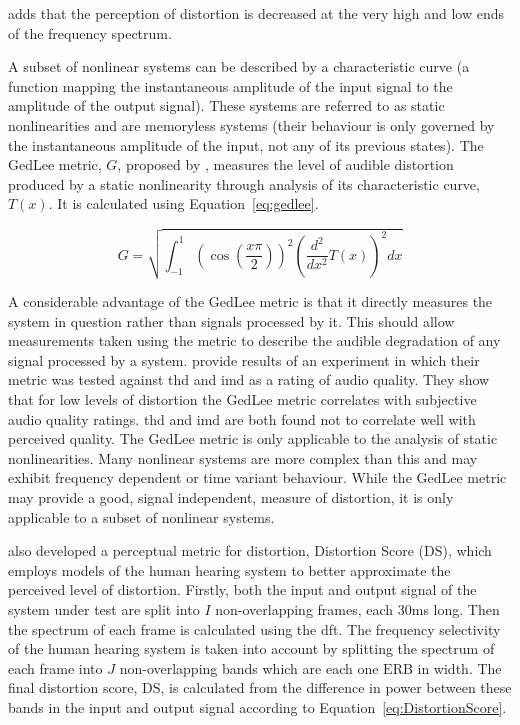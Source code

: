 			\citet{voishvillo2006assessment} adds that the perception of distortion is decreased at the very
			high and low ends of the frequency spectrum.

			A subset of nonlinear systems can be described by a characteristic curve (a function mapping the
			instantaneous amplitude of the input signal to the amplitude of the output signal). These systems
			are referred to as static nonlinearities and are memoryless systems (their behaviour is only
			governed by the instantaneous amplitude of the input, not any of its previous states). The GedLee
			metric, $G$, proposed by \citet{geddes2003auditory}, measures the level of audible distortion
			produced by a static nonlinearity through analysis of its characteristic curve, $T(x)$. It is
			calculated using Equation~\ref{eq:gedlee}.

			\begin{equation}
				G = \sqrt{\int_{-1}^{1} \left( \cos \left( \frac{x\pi}{2} \right) \right)^{2}
					      \left( \frac{d^{2}}{dx^{2}} T(x) \right)^{2} dx}
				\label{eq:gedlee}
			\end{equation}

			A considerable advantage of the GedLee metric is that it directly measures the system in question
			rather than signals processed by it. This should allow measurements taken using the metric to
			describe the audible degradation of any signal processed by a system. \citet{lee2003auditory}
			provide results of an experiment in which their metric was tested against \acrshort{thd} and
			\acrshort{imd} as a rating of audio quality. They show that for low levels of distortion the GedLee
			metric correlates with subjective audio quality ratings. \acrshort{thd} and \acrshort{imd} are both
			found not to correlate well with perceived quality. The GedLee metric is only applicable to the
			analysis of static nonlinearities. Many nonlinear systems are more complex than this and may
			exhibit frequency dependent or time variant behaviour. While the GedLee metric may provide a good,
			signal independent, measure of distortion, it is only applicable to a subset of nonlinear systems.

			\citet{tan2003the} also developed a perceptual metric for distortion, Distortion Score
			($\mathrm{DS}$), which employs models of the human hearing system to better approximate the
			perceived level of distortion. Firstly, both the input and output signal of the system under test
			are split into $I$ non-overlapping frames, each 30ms long. Then the spectrum of each frame is
			calculated using the \acrshort{dft}. The frequency selectivity of the human hearing system is taken
			into account by splitting the spectrum of each frame into $J$ non-overlapping bands which are each
			one $\mathrm{ERB}$ in width. The final distortion score, $\mathrm{DS}$, is calculated from the
			difference in power between these bands in the input and output signal according to
			Equation~\ref{eq:DistortionScore}.

